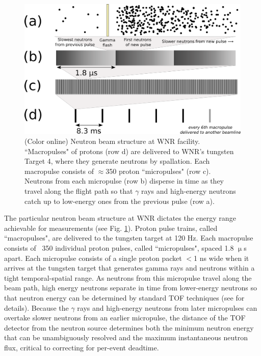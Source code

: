 \begin{figure}
    \includegraphics[scale=0.4]{figures/beamStructure.png}
    \caption{(Color online) Neutron beam structure at WNR facility.
        ``Macropulses" of protons (row d) are delivered to
        WNR's tungsten Target 4, where they generate neutrons by spallation.
        Each macropulse consists of
        $\approx$350 proton ``micropulses" (row c). Neutrons
        from each micropulse (row b) disperse in
        time as they travel along the flight path so that $\gamma$ rays and high-energy 
    neutrons catch up to low-energy ones from the previous pulse (row a).}
    \label{BeamStructure}
\end{figure}

The particular neutron beam structure at WNR dictates the energy range
achievable for \totEs measurements (see Fig. \ref{BeamStructure}).
Proton pulse trains, called ``macropulses", are delivered to the tungsten target at 120 Hz.
Each macropulse consists of ~350 individual proton pulses, called ``micropulses", spaced 1.8 
$\upmu$s apart. Each micropulse consists of a single proton packet $<$1 ns wide when it 
arrives at the tungsten target that generates gamma rays and neutrons within a tight
temporal-spatial range. As neutrons from this micropulse travel along the beam path, 
high energy neutrons separate in time from lower-energy neutrons so that neutron
energy can be determined by standard TOF techniques (see \cite{Moore1980} for details).
Because the $\gamma$ rays and high-energy neutrons from later micropulses can
overtake slower neutrons from an earlier micropulse, the distance of the TOF
detector from the neutron source determines both the minimum neutron energy that can be 
unambiguously resolved and the maximum instantaneous neutron flux, critical to correcting
for per-event deadtime.

